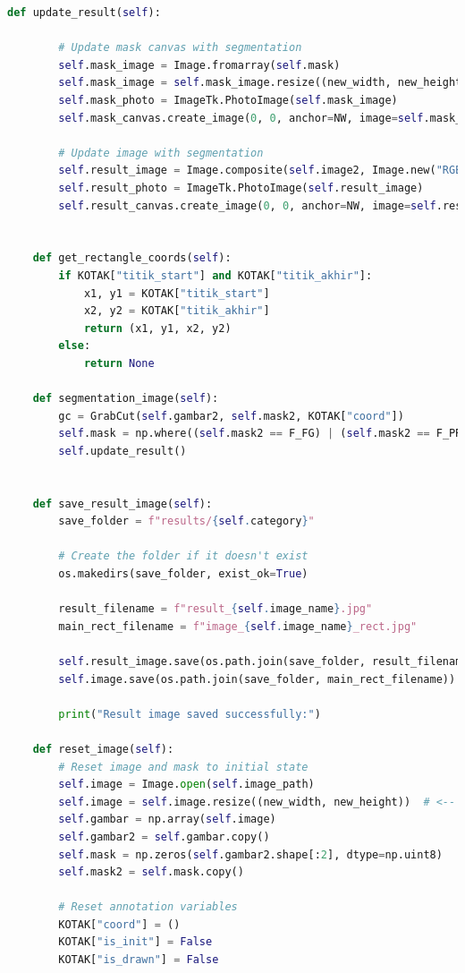 \begin{lstlisting}[language=Python, basicstyle=\tiny]
    def update_result(self):

		# Update mask canvas with segmentation
        self.mask_image = Image.fromarray(self.mask)
        self.mask_image = self.mask_image.resize((new_width, new_height)) # <-- untuk resize ukuran
        self.mask_photo = ImageTk.PhotoImage(self.mask_image)
        self.mask_canvas.create_image(0, 0, anchor=NW, image=self.mask_photo)

        # Update image with segmentation
        self.result_image = Image.composite(self.image2, Image.new("RGB", self.image.size, "black"), self.mask_image)
        self.result_photo = ImageTk.PhotoImage(self.result_image)
        self.result_canvas.create_image(0, 0, anchor=NW, image=self.result_photo)
   

    def get_rectangle_coords(self):
        if KOTAK["titik_start"] and KOTAK["titik_akhir"]:
            x1, y1 = KOTAK["titik_start"]
            x2, y2 = KOTAK["titik_akhir"]
            return (x1, y1, x2, y2)
        else:
            return None

    def segmentation_image(self):
        gc = GrabCut(self.gambar2, self.mask2, KOTAK["coord"])
        self.mask = np.where((self.mask2 == F_FG) | (self.mask2 == F_PR_FG), 255, 0).astype('uint8')
        self.update_result()


    def save_result_image(self):
        save_folder = f"results/{self.category}"

        # Create the folder if it doesn't exist
        os.makedirs(save_folder, exist_ok=True)

        result_filename = f"result_{self.image_name}.jpg"
        main_rect_filename = f"image_{self.image_name}_rect.jpg"

        self.result_image.save(os.path.join(save_folder, result_filename))
        self.image.save(os.path.join(save_folder, main_rect_filename))

        print("Result image saved successfully:")

    def reset_image(self):
        # Reset image and mask to initial state
        self.image = Image.open(self.image_path)
        self.image = self.image.resize((new_width, new_height))  # <-- untuk resize ukuran
        self.gambar = np.array(self.image)
        self.gambar2 = self.gambar.copy()
        self.mask = np.zeros(self.gambar2.shape[:2], dtype=np.uint8)
        self.mask2 = self.mask.copy()

        # Reset annotation variables
        KOTAK["coord"] = ()
        KOTAK["is_init"] = False
        KOTAK["is_drawn"] = False


\end{lstlisting}
